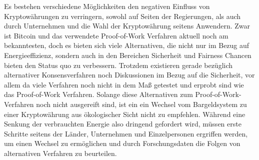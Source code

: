 Es bestehen verschiedene Möglichkeiten den negativen Einfluss von Kryptowährungen zu verringern, sowohl auf Seiten der Regierungen, als auch durch Unternehmen und die Wahl der Kryptowährung seitens Anwendern. Zwar ist Bitcoin und das verwendete Proof-of-Work Verfahren aktuell noch am bekanntesten, doch es bieten sich viele Alternativen, die nicht nur im Bezug auf Energieeffizienz, sondern auch in den Bereichen Sicherheit und Fairness Chancen bieten den Status quo zu verbessern. Trotzdem existieren gerade bezüglich alternativer Konsensverfahren noch Diskussionen im Bezug auf die Sicherheit, vor allem da viele Verfahren noch nicht in dem Maß getestet und erprobt sind wie das Proof-of-Work Verfahren. Solange diese Alternativen zum Proof-of-Work-Verfahren noch nicht ausgereift sind, ist ein ein Wechsel vom Bargeldsystem zu einer Kryptowährung aus ökologischer Sicht nicht zu empfehlen. Während eine Senkung der verbrauchten Energie also dringend gefordert wird, müssen erste Schritte seitens der Länder, Unternehmen und Einzelpersonen ergriffen werden, um einen Wechsel zu ermöglichen und durch Forschungsdaten die Folgen von alternativen Verfahren zu beurteilen.